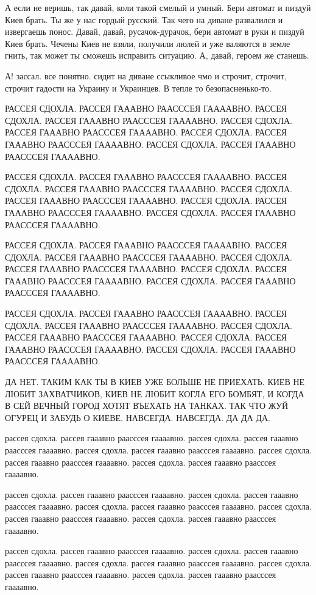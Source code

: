 А если не веришь, так давай, коли такой смелый и умный. Бери автомат и пиздуй
Киев брать. Ты же у нас гордый русский. Так чего на диване развалился и
извергаешь понос. Давай, давай, русачок-дурачок, бери автомат в руки и пиздуй
Киев брать. Чечены Киев не взяли, получили люлей и уже валяются в земле гнить,
так может ты сможешь исправить ситуацию. А, давай, героем же станешь.

А! зассал. все понятно. сидит на диване ссыкливое чмо и строчит, строчит,
строчит гадости на Украину и Украинцев. В тепле то безопасненько-то.

РАССЕЯ СДОХЛА. РАССЕЯ ГАААВНО РААСССЕЯ ГААААВНО. РАССЕЯ СДОХЛА. РАССЕЯ ГАААВНО
РААСССЕЯ ГААААВНО. РАССЕЯ СДОХЛА. РАССЕЯ ГАААВНО РААСССЕЯ ГААААВНО. РАССЕЯ
СДОХЛА. РАССЕЯ ГАААВНО РААСССЕЯ ГААААВНО. РАССЕЯ СДОХЛА. РАССЕЯ ГАААВНО
РААСССЕЯ ГААААВНО.

РАССЕЯ СДОХЛА. РАССЕЯ ГАААВНО РААСССЕЯ ГААААВНО. РАССЕЯ СДОХЛА. РАССЕЯ ГАААВНО
РААСССЕЯ ГААААВНО. РАССЕЯ СДОХЛА. РАССЕЯ ГАААВНО РААСССЕЯ ГААААВНО. РАССЕЯ
СДОХЛА. РАССЕЯ ГАААВНО РААСССЕЯ ГААААВНО. РАССЕЯ СДОХЛА. РАССЕЯ ГАААВНО
РААСССЕЯ ГААААВНО.

РАССЕЯ СДОХЛА. РАССЕЯ ГАААВНО РААСССЕЯ ГААААВНО. РАССЕЯ СДОХЛА. РАССЕЯ ГАААВНО
РААСССЕЯ ГААААВНО. РАССЕЯ СДОХЛА. РАССЕЯ ГАААВНО РААСССЕЯ ГААААВНО. РАССЕЯ
СДОХЛА. РАССЕЯ ГАААВНО РААСССЕЯ ГААААВНО. РАССЕЯ СДОХЛА. РАССЕЯ ГАААВНО
РААСССЕЯ ГААААВНО.

РАССЕЯ СДОХЛА. РАССЕЯ ГАААВНО РААСССЕЯ ГААААВНО. РАССЕЯ СДОХЛА. РАССЕЯ ГАААВНО
РААСССЕЯ ГААААВНО. РАССЕЯ СДОХЛА. РАССЕЯ ГАААВНО РААСССЕЯ ГААААВНО. РАССЕЯ
СДОХЛА. РАССЕЯ ГАААВНО РААСССЕЯ ГААААВНО. РАССЕЯ СДОХЛА. РАССЕЯ ГАААВНО
РААСССЕЯ ГААААВНО.

ДА НЕТ. ТАКИМ КАК ТЫ В КИЕВ УЖЕ БОЛЬШЕ НЕ ПРИЕХАТЬ. КИЕВ НЕ ЛЮБИТ ЗАХВАТЧИКОВ,
КИЕВ НЕ ЛЮБИТ КОГЛА ЕГО БОМБЯТ, И КОГДА В СЕЙ ВЕЧНЫЙ ГОРОД ХОТЯТ ВЪЕХАТЬ НА
ТАНКАХ. ТАК ЧТО ЖУЙ ОГУРЕЦ И ЗАБУДЬ О КИЕВЕ. НАВСЕГДА. НАВСЕГДА. ДА ДА ДА.

рассея сдохла. рассея гааавно раасссея гаааавно. рассея сдохла. рассея гааавно
раасссея гаааавно. рассея сдохла. рассея гааавно раасссея гаааавно. рассея
сдохла. рассея гааавно раасссея гаааавно. рассея сдохла. рассея гааавно
раасссея гаааавно.

рассея сдохла. рассея гааавно раасссея гаааавно. рассея сдохла. рассея гааавно
раасссея гаааавно. рассея сдохла. рассея гааавно раасссея гаааавно. рассея
сдохла. рассея гааавно раасссея гаааавно. рассея сдохла. рассея гааавно
раасссея гаааавно.

рассея сдохла. рассея гааавно раасссея гаааавно. рассея сдохла. рассея гааавно
раасссея гаааавно. рассея сдохла. рассея гааавно раасссея гаааавно. рассея
сдохла. рассея гааавно раасссея гаааавно. рассея сдохла. рассея гааавно
раасссея гаааавно.

